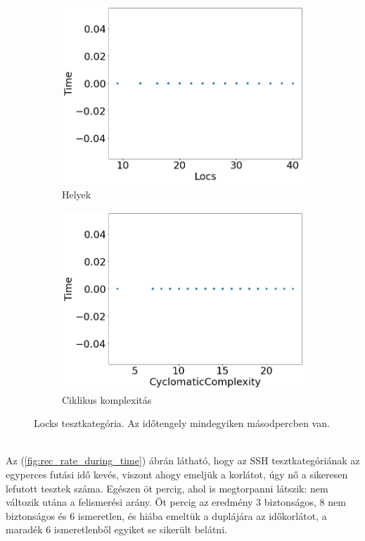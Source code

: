 \begin{figure}[ht]
\begin{subfigure}[b]{0.5\linewidth}
		\includegraphics[width=0.95\linewidth]{figures/locks/locs.png} 
		\caption{Helyek} 
		\label{fig7:c} 
	\end{subfigure}%
	\begin{subfigure}[b]{0.5\linewidth}
		\centering
		\includegraphics[width=0.95\linewidth]{figures/locks/cc.png} 
		\caption{Ciklikus komplexitás} 
		\label{fig7:d} 
	\end{subfigure} 
	\caption{Locks tesztkategória. Az időtengely mindegyiken másodpercben van.\label{fig:locks} }
\end{figure}
\ \\
Az (\ref{fig:rec_rate_during_time}) ábrán látható, hogy az SSH tesztkategóriának az egyperces futási idő kevés, viszont ahogy emeljük a korlátot, úgy nő a sikeresen lefutott tesztek száma. Egészen öt percig, ahol is megtorpanni látszik: nem változik utána a felismerési arány. Öt percig az eredmény 3 biztonságos, 8 nem biztonságos és 6 ismeretlen, és hiába emeltük a duplájára az időkorlátot, a maradék 6 ismeretlenből egyiket se sikerült belátni. 

